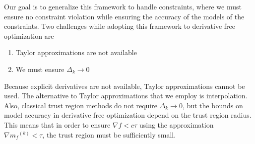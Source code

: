 \documentclass{article}
\theoremstyle{case}
\newcommand{\modelk}{{{m}_f}^{(k)}}
\begin{document}
Our goal is to generalize this framework to handle constraints, where we must ensure no constraint violation while ensuring the accuracy of the models of the constraints.
Two challenges while adopting this framework to derivative free optimization are
\begin{enumerate}
    \item Taylor approximations are not available
    \item We must ensure $\Delta_k \to 0$
\end{enumerate}
Because explicit derivatives are not available, Taylor approximations cannot be used.
The alternative to Taylor approximations that we employ is interpolation.
Also, classical trust region methods do not require $\Delta_k \to 0$, but the bounds on model accuracy in derivative free optimization depend on the trust region radius.
This means that in order to ensure $\nabla f < c\tau$ using the approximation  $\nabla \modelk < \tau$, the trust region must be sufficiently small.
  

\end{document}
